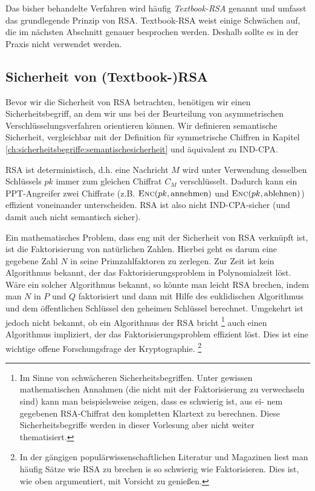 Das bisher behandelte Verfahren wird häufig \textit{Textbook-RSA}
\indexRSATextBook genannt und umfasst das grundlegende Prinzip von
RSA. Textbook-RSA weist einige Schwächen auf, die im nächsten Abschnitt
genauer besprochen werden. Deshalb sollte es in der Praxis nicht
verwendet werden.

\subsection{Sicherheit von (Textbook-)RSA}
\label{ch:asymmenc:rsa:sicherheit} Bevor wir die Sicherheit von RSA
betrachten, benötigen wir einen Sicherheitsbegriff, an dem wir uns bei
der Beurteilung von asymmetrischen Verschlüsselungsverfahren orientieren
können. Wir definieren semantische Sicherheit, vergleichbar mit der
Definition für symmetrische Chiffren in Kapitel
\ref{ch:sicherheitsbegriffe:semantischesicherheit} und äquivalent zu
IND-CPA.

RSA ist deterministisch, d.h. eine Nachricht $M$ wird unter Verwendung
desselben Schlüssels $pk$ immer zum gleichen Chiffrat $C_M$
verschlüsselt. Dadurch kann ein PPT-Angreifer zwei Chiffrate
(z.B. $\textsc{Enc}(pk, \text{annehmen})$ und $\textsc{Enc}(pk, \text{ablehnen})$)
effizient voneinander unterscheiden. RSA ist also nicht IND-CPA-sicher
(und damit auch nicht semantisch sicher).

Ein mathematisches Problem, dass eng mit der Sicherheit von RSA
verknüpft ist, ist die Faktorisierung von natürlichen Zahlen. Hierbei
geht es darum eine gegebene Zahl $N$ in seine Primzahlfaktoren zu
zerlegen. Zur Zeit ist kein Algorithmus bekannt, der das
Faktorisierungsproblem in Polynomialzeit löst. Wäre ein solcher
Algorithmus bekannt, so könnte man leicht RSA \glqq brechen\grqq , indem
man $N$ in $P$ und $Q$ faktorisiert und dann mit Hilfe des euklidischen
Algorithmus und dem öffentlichen Schlüssel den geheimen Schlüssel
berechnet. Umgekehrt ist jedoch nicht bekannt, ob ein Algorithmus der
RSA bricht \footnote{Im Sinne von schwächeren
  Sicherheitsbegriffen. Unter gewissen mathematischen Annahmen (die nicht
  mit der Faktorisierung zu verwechseln sind) kann man beispielsweise
  zeigen, dass es schwierig ist, aus ei- nem gegebenen RSA-Chiffrat den
  kompletten Klartext zu berechnen. Diese Sicherheitsbegriffe werden in
  dieser Vorlesung aber nicht weiter thematisiert.} auch einen Algorithmus
impliziert, der das Faktorisierungsproblem effizient löst. Dies ist eine
wichtige offene Forschungsfrage der Kryptographie. \footnote{In der
  gängigen populärwissenschaftlichen Literatur und Magazinen liest man
  häufig Sätze wie \glqq RSA zu brechen is so schwierig wie
  Faktorisieren\grqq. Dies ist, wie oben argumentiert, mit Vorsicht zu
  genießen.}

